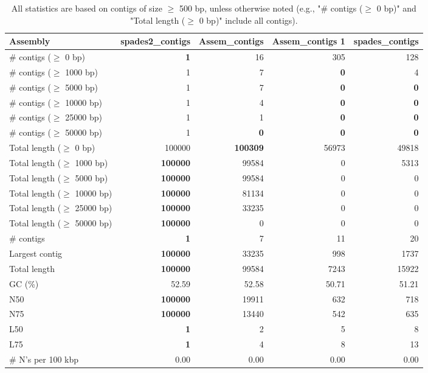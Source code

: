 \documentclass[12pt,a4paper]{article}
\begin{document}
\begin{table}[ht]
\begin{center}
\caption{All statistics are based on contigs of size $\geq$ 500 bp, unless otherwise noted (e.g., "\# contigs ($\geq$ 0 bp)" and "Total length ($\geq$ 0 bp)" include all contigs).}
\begin{tabular}{|l*{4}{|r}|}
\hline
Assembly & spades2\_contigs & Assem\_contigs & Assem\_contigs 1 & spades\_contigs \\ \hline
\# contigs ($\geq$ 0 bp) & {\bf 1} & 16 & 305 & 128 \\ \hline
\# contigs ($\geq$ 1000 bp) & 1 & 7 & {\bf 0} & 4 \\ \hline
\# contigs ($\geq$ 5000 bp) & 1 & 7 & {\bf 0} & {\bf 0} \\ \hline
\# contigs ($\geq$ 10000 bp) & 1 & 4 & {\bf 0} & {\bf 0} \\ \hline
\# contigs ($\geq$ 25000 bp) & 1 & 1 & {\bf 0} & {\bf 0} \\ \hline
\# contigs ($\geq$ 50000 bp) & 1 & {\bf 0} & {\bf 0} & {\bf 0} \\ \hline
Total length ($\geq$ 0 bp) & 100000 & {\bf 100309} & 56973 & 49818 \\ \hline
Total length ($\geq$ 1000 bp) & {\bf 100000} & 99584 & 0 & 5313 \\ \hline
Total length ($\geq$ 5000 bp) & {\bf 100000} & 99584 & 0 & 0 \\ \hline
Total length ($\geq$ 10000 bp) & {\bf 100000} & 81134 & 0 & 0 \\ \hline
Total length ($\geq$ 25000 bp) & {\bf 100000} & 33235 & 0 & 0 \\ \hline
Total length ($\geq$ 50000 bp) & {\bf 100000} & 0 & 0 & 0 \\ \hline
\# contigs & {\bf 1} & 7 & 11 & 20 \\ \hline
Largest contig & {\bf 100000} & 33235 & 998 & 1737 \\ \hline
Total length & {\bf 100000} & 99584 & 7243 & 15922 \\ \hline
GC (\%) & 52.59 & 52.58 & 50.71 & 51.21 \\ \hline
N50 & {\bf 100000} & 19911 & 632 & 718 \\ \hline
N75 & {\bf 100000} & 13440 & 542 & 635 \\ \hline
L50 & {\bf 1} & 2 & 5 & 8 \\ \hline
L75 & {\bf 1} & 4 & 8 & 13 \\ \hline
\# N's per 100 kbp & 0.00 & 0.00 & 0.00 & 0.00 \\ \hline
\end{tabular}
\end{center}
\end{table}
\end{document}
